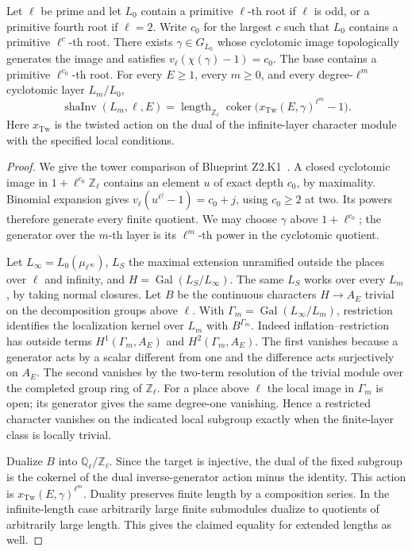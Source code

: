 \begin{theorem}\label{pn:P031}
Let \(\ell\) be prime and let \(L_0\) contain a primitive \(\ell\)-th
root if \(\ell\) is odd, or a primitive fourth root if \(\ell=2\).
Write \(c_0\) for the largest \(c\) such that \(L_0\) contains a
primitive \(\ell^c\)-th root. There exists \(\gamma\in G_{L_0}\) whose
cyclotomic image topologically generates the image and satisfies
\(v_\ell(\chi(\gamma)-1)=c_0\). The base contains a primitive
\(\ell^{c_0}\)-th root. For every \(E\ge1\), every \(m\ge0\), and
every degree-\(\ell^m\) cyclotomic layer \(L_m/L_0\),
\[
 \operatorname{shaInv}(L_m,\ell,E)=
 \operatorname{length}_{\mathbb Z_\ell}
 \operatorname{coker}\bigl(x_{\mathrm{Tw}}(E,\gamma)^{\ell^m}-1\bigr).
\]
Here \(x_{\mathrm{Tw}}\) is the twisted action on the dual of the
infinite-layer character module with the specified local conditions.
\end{theorem}
\begin{proof}
We give the tower comparison of Blueprint Z2.K1~. A closed cyclotomic
image in \(1+\ell^{c_0}\mathbb Z_\ell\) contains an element \(u\) of
exact depth \(c_0\), by maximality. Binomial expansion gives
\(v_\ell(u^{\ell^j}-1)=c_0+j\), using \(c_0\ge2\) at two.
Its powers therefore generate every finite quotient. We may choose
\(\gamma\) above \(1+\ell^{c_0}\); the generator over the \(m\)-th
layer is its \(\ell^m\)-th power in the cyclotomic quotient.

Let \(L_\infty=L_0(\mu_{\ell^\infty})\), \(L_S\) the maximal
extension unramified outside the places over \(\ell\) and infinity,
and \(H=\operatorname{Gal}(L_S/L_\infty)\). The same \(L_S\) works
over every \(L_m\), by taking normal closures. Let \(B\) be the
continuous characters \(H\to A_E\) trivial on the decomposition groups
above \(\ell\). With \(\Gamma_m=\operatorname{Gal}(L_\infty/L_m)\),
restriction identifies the localization kernel over \(L_m\) with
\(B^{\Gamma_m}\). Indeed inflation--restriction has outside terms
\(H^1(\Gamma_m,A_E)\) and \(H^2(\Gamma_m,A_E)\). The first vanishes
because a generator acts by a scalar different from one and the
difference acts surjectively on \(A_E\). The second vanishes by the
two-term resolution of the trivial module over the completed group
ring of \(\mathbb Z_\ell\). For a place above \(\ell\) the local image
in \(\Gamma_m\) is open; its generator gives the same degree-one
vanishing. Hence a restricted character vanishes on the indicated
local subgroup exactly when the finite-layer class is locally trivial.

Dualize \(B\) into \(\mathbb Q_\ell/\mathbb Z_\ell\). Since the target
is injective, the dual of the fixed subgroup is the cokernel of the
dual inverse-generator action minus the identity. This action is
\(x_{\mathrm{Tw}}(E,\gamma)^{\ell^m}\). Duality preserves finite
length by a composition series. In the infinite-length case arbitrarily
large finite submodules dualize to quotients of arbitrarily large length.
This gives the claimed equality for extended lengths as well.
\end{proof}

